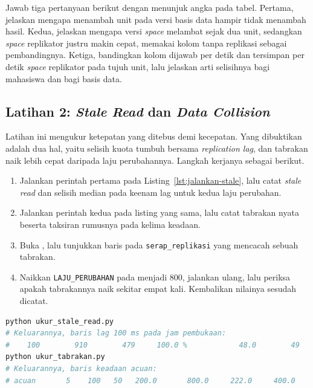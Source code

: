 Jawab tiga pertanyaan berikut dengan menunjuk angka pada tabel. Pertama,
jelaskan mengapa menambah unit pada versi basis data hampir tidak menambah
hasil. Kedua, jelaskan mengapa versi \textit{space} melambat sejak dua unit,
sedangkan \textit{space} replikator justru makin cepat, memakai kolom tanpa
replikasi sebagai pembandingnya. Ketiga, bandingkan kolom dijawab per detik dan
tersimpan per detik \textit{space} replikator pada tujuh unit, lalu jelaskan arti
selisihnya bagi mahasiswa dan bagi basis data.

\subsection*{Latihan 2: \textit{Stale Read} dan \textit{Data Collision}}

Latihan ini mengukur ketepatan yang ditebus demi kecepatan. Yang dibuktikan
adalah dua hal, yaitu selisih kuota tumbuh bersama \textit{replication lag},
dan tabrakan naik lebih cepat daripada laju perubahannya. Langkah kerjanya
sebagai berikut.

\begin{enumerate}
  \item Jalankan perintah pertama pada Listing~\ref{lst:jalankan-stale}, lalu
    catat \textit{stale read} dan selisih median pada keenam lag untuk kedua laju
    perubahan.
  \item Jalankan perintah kedua pada listing yang sama, lalu catat tabrakan
    nyata beserta taksiran rumusnya pada kelima keadaan.
  \item Buka , lalu tunjukkan baris pada
    \texttt{serap\_replikasi} yang mencacah sebuah tabrakan.
  \item Naikkan \texttt{LAJU\_PERUBAHAN} pada
     menjadi 800, jalankan ulang,
    lalu periksa apakah tabrakannya naik sekitar empat kali. Kembalikan
    nilainya sesudah dicatat.
\end{enumerate}

\begin{lstlisting}[language=bash, caption={Mengukur \textit{stale read} dan
  \textit{data collision}, kedua skrip tersedia di \berkas{sources/chapter08/}},
  label=lst:jalankan-stale]
python ukur_stale_read.py
# Keluarannya, baris lag 100 ms pada jam pembukaan:
#    100        910        479     100.0 %            48.0        49
python ukur_tabrakan.py
# Keluarannya, baris keadaan acuan:
# acuan       5    100   50   200.0       800.0     222.0     400.0
\end{lstlisting}

